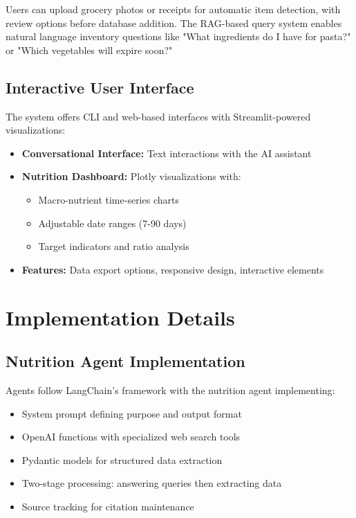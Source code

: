 \documentclass{ecai}
\begin{document}
Users can upload grocery photos or receipts for automatic item detection, with review options before database addition. The RAG-based query system enables natural language inventory questions like "What ingredients do I have for pasta?" or "Which vegetables will expire soon?"

\subsection{Interactive User Interface}

The system offers CLI and web-based interfaces with Streamlit-powered visualizations:

\begin{itemize}[noitemsep,topsep=0pt]
    \item \textbf{Conversational Interface:} Text interactions with the AI assistant
    \item \textbf{Nutrition Dashboard:} Plotly visualizations with:
      \begin{itemize}[noitemsep,topsep=0pt]
        \item Macro-nutrient time-series charts
        \item Adjustable date ranges (7-90 days)
        \item Target indicators and ratio analysis
      \end{itemize}
    \item \textbf{Features:} Data export options, responsive design, interactive elements
\end{itemize}

\section{Implementation Details}

\subsection{Nutrition Agent Implementation}

Agents follow LangChain's framework with the nutrition agent implementing:
\begin{itemize}[noitemsep,topsep=0pt]
    \item System prompt defining purpose and output format
    \item OpenAI functions with specialized web search tools
    \item Pydantic models for structured data extraction
    \item Two-stage processing: answering queries then extracting data
    \item Source tracking for citation maintenance
\end{itemize}
\end{document}
